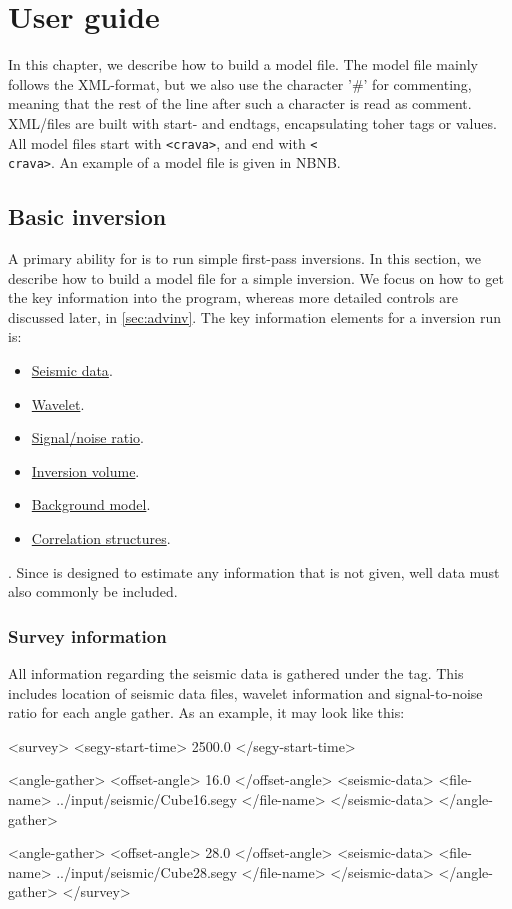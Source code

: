 \chapter{User guide}
\label{sec:userguide}

In this chapter, we describe how to build a \crava model file. The model file mainly follows the XML-format, but we also use the character '\#' for commenting, meaning that the rest of the line after such a character is read as comment. XML/files are built with start- and endtags, encapsulating toher tags or values. All model files start with \texttt{<crava>}, and end with \texttt{<\\crava>}. An example of a model file is given in NBNB.

\section{Basic inversion}
\label{sec:basicinv}
A primary ability for \crava is to run simple first-pass inversions. In this section, we describe how to build a model file for a simple inversion. We focus on how to get the key information into the program, whereas more detailed controls are discussed later, in \autoref{sec:advinv}. The key information elements for a \crava inversion run is:
\begin{itemize}
\item \hyperref[sec:basicseis]{Seismic data}.
\item \hyperref[sec:basicwave]{Wavelet}.
\item \hyperref[sec:basicnoise]{Signal/noise ratio}.
\item \hyperref[sec:basicvol]{Inversion volume}.
\item \hyperref[sec:basicbg]{Background model}.
\item \hyperref[sec:basiccorr]{Correlation structures}.
\end{itemize}.
Since \crava is designed to estimate any information that is not given, well data must also commonly be included.

\subsection{Survey information}
All information regarding the seismic data is gathered under the  tag. This includes location of seismic data files, wavelet information and signal-to-noise ratio for each angle gather. As an example, it may look like this:
\begin{example}
<survey>
  <segy-start-time>  2500.0 </segy-start-time>

  <angle-gather>
    <offset-angle>     16.0 </offset-angle>
    <seismic-data>
      <file-name> ../input/seismic/Cube16.segy </file-name>
    </seismic-data>
  </angle-gather>

  <angle-gather>
    <offset-angle>     28.0 </offset-angle>
    <seismic-data>
      <file-name> ../input/seismic/Cube28.segy </file-name>
    </seismic-data>
  </angle-gather>
</survey>
\end{example}

